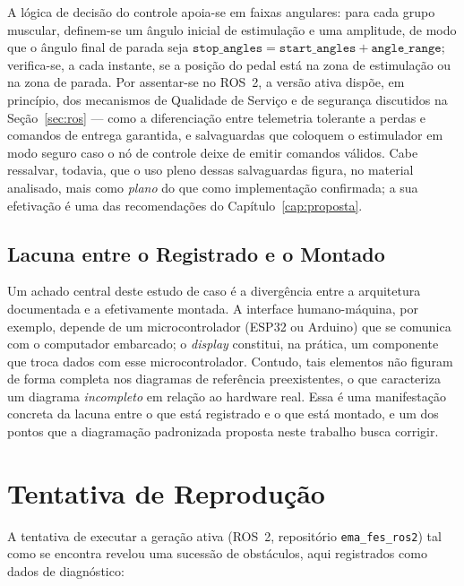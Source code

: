 A lógica de decisão do controle apoia-se em faixas angulares: para cada grupo muscular,
definem-se um ângulo inicial de estimulação e uma amplitude, de modo que o ângulo final de
parada seja $\texttt{stop\_angles} = \texttt{start\_angles} + \texttt{angle\_range}$;
verifica-se, a cada instante, se a posição do pedal está na zona de estimulação ou na zona de
parada. Por assentar-se no ROS~2, a versão ativa dispõe, em princípio, dos mecanismos de
Qualidade de Serviço e de segurança discutidos na Seção~\ref{sec:ros} --- como a
diferenciação entre telemetria tolerante a perdas e comandos de entrega garantida, e
salvaguardas que coloquem o estimulador em modo seguro caso o nó de controle deixe de emitir
comandos válidos. Cabe ressalvar, todavia, que o uso pleno dessas salvaguardas figura, no
material analisado, mais como \emph{plano} do que como implementação confirmada; a sua
efetivação é uma das recomendações do Capítulo~\ref{cap:proposta}.

\subsection{Lacuna entre o Registrado e o Montado}

Um achado central deste estudo de caso é a divergência entre a arquitetura documentada e a
efetivamente montada. A interface humano-máquina, por exemplo, depende de um
microcontrolador (ESP32 ou Arduino) que se comunica com o computador embarcado; o
\emph{display} constitui, na prática, um componente que troca dados com esse
microcontrolador. Contudo, tais elementos não figuram de forma completa nos diagramas de
referência preexistentes, o que caracteriza um diagrama \emph{incompleto} em relação ao
hardware real. Essa é uma manifestação concreta da lacuna entre o que está registrado e o
que está montado, e um dos pontos que a diagramação padronizada proposta neste trabalho
busca corrigir.

\section{Tentativa de Reprodução}
\label{sec:trike-reproducao}

A tentativa de executar a geração ativa (ROS~2, repositório \texttt{ema\_fes\_ros2}) tal
como se encontra revelou uma sucessão de obstáculos, aqui registrados como dados de
diagnóstico:

